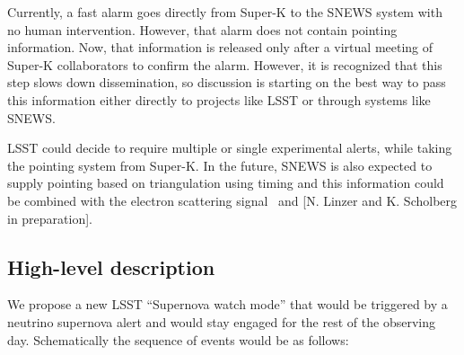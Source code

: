 \documentclass[11pt, letterpaper]{article}
\newcommand{\superk}  {Super\nobreakdash-K\xspace}
\begin{document}
Currently, a fast alarm goes directly from \superk to the SNEWS system
with no human intervention.  However, that alarm does not contain
pointing information.  Now, that information is released only after a
virtual meeting of \superk collaborators to confirm the alarm.
However, it is recognized that this step slows down dissemination, so
discussion is starting on the best way to pass this information either
directly to projects like LSST or through systems like SNEWS.

LSST could decide to require multiple or single experimental alerts,
while taking the pointing system from \superk.  In the future, SNEWS
is also expected to supply pointing based on triangulation using
timing and this information could be combined with the electron
scattering signal~\cite{2018JCAP...04..025B} and [N. Linzer and
K. Scholberg in preparation].

\subsection{High-level description}

We propose a new LSST ``Supernova watch mode'' that would be triggered by a
neutrino supernova alert and would stay engaged for the rest of the
observing day.  Schematically the sequence of events would be as follows:
\end{document}
